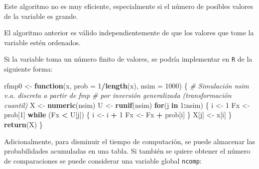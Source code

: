\documentclass[
]{book}
\newenvironment{Shaded}{\begin{snugshade}}{\end{snugshade}}
\newcommand{\CommentTok}[1]{\textcolor[rgb]{0.56,0.35,0.01}{\textit{#1}}}
\newcommand{\ControlFlowTok}[1]{\textcolor[rgb]{0.13,0.29,0.53}{\textbf{#1}}}
\newcommand{\DataTypeTok}[1]{\textcolor[rgb]{0.13,0.29,0.53}{#1}}
\newcommand{\DecValTok}[1]{\textcolor[rgb]{0.00,0.00,0.81}{#1}}
\newcommand{\KeywordTok}[1]{\textcolor[rgb]{0.13,0.29,0.53}{\textbf{#1}}}
\newcommand{\NormalTok}[1]{#1}
\newcommand{\OperatorTok}[1]{\textcolor[rgb]{0.81,0.36,0.00}{\textbf{#1}}}
\newcommand{\StringTok}[1]{\textcolor[rgb]{0.31,0.60,0.02}{#1}}
\theoremstyle{break}
\theoremstyle{definition}
\theoremstyle{definition}
\theoremstyle{definition}
\theoremstyle{remark}
\let\BeginKnitrBlock\begin \let\EndKnitrBlock\end
\begin{document}
Este algoritmo no es muy eficiente, especialmente si el número de
posibles valores de la variable es grande.

\BeginKnitrBlock{remark}
{}El algoritmo anterior es válido independientemente de que los
valores que tome la variable estén ordenados.
\EndKnitrBlock{remark}

Si la variable toma un número finito de valores, se podría implementar en \texttt{R}
de la siguiente forma:

\begin{Shaded}
\begin{Highlighting}[]
\NormalTok{rfmp0 <-}\StringTok{ }\ControlFlowTok{function}\NormalTok{(x, }\DataTypeTok{prob =} \DecValTok{1}\OperatorTok{/}\KeywordTok{length}\NormalTok{(x), }\DataTypeTok{nsim =} \DecValTok{1000}\NormalTok{) \{}
  \CommentTok{# Simulación nsim v.a. discreta a partir de fmp}
  \CommentTok{# por inversión generalizada (transformación cuantil)}
\NormalTok{  X <-}\StringTok{ }\KeywordTok{numeric}\NormalTok{(nsim)}
\NormalTok{  U <-}\StringTok{ }\KeywordTok{runif}\NormalTok{(nsim)}
  \ControlFlowTok{for}\NormalTok{(j }\ControlFlowTok{in} \DecValTok{1}\OperatorTok{:}\NormalTok{nsim) \{}
\NormalTok{    i <-}\StringTok{ }\DecValTok{1}
\NormalTok{    Fx <-}\StringTok{ }\NormalTok{prob[}\DecValTok{1}\NormalTok{]}
    \ControlFlowTok{while}\NormalTok{ (Fx }\OperatorTok{<}\StringTok{ }\NormalTok{U[j]) \{}
\NormalTok{      i <-}\StringTok{ }\NormalTok{i }\OperatorTok{+}\StringTok{ }\DecValTok{1}
\NormalTok{      Fx <-}\StringTok{ }\NormalTok{Fx }\OperatorTok{+}\StringTok{ }\NormalTok{prob[i]}
\NormalTok{    \}}
\NormalTok{    X[j] <-}\StringTok{ }\NormalTok{x[i]}
\NormalTok{  \}}
  \KeywordTok{return}\NormalTok{(X)}
\NormalTok{\}}
\end{Highlighting}
\end{Shaded}

Adicionalmente, para disminuir el tiempo de computación, se puede almacenar
las probabilidades acumuladas en una tabla.
Si también se quiere obtener el número de comparaciones
se puede considerar una variable global \texttt{ncomp}:
\end{document}
